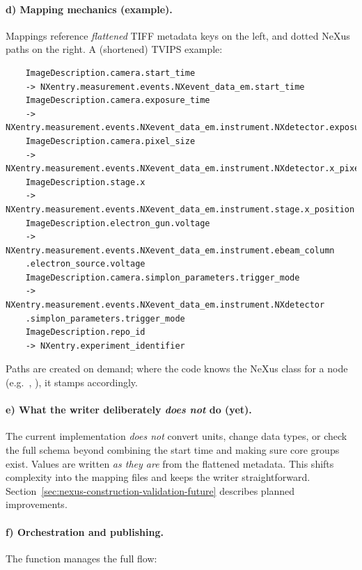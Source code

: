 \paragraph{d) Mapping mechanics (example).}
Mappings reference \emph{flattened} TIFF metadata keys on the left, and dotted NeXus paths on the right. A (shortened) TVIPS example:
\begin{verbatim}
	ImageDescription.camera.start_time
	-> NXentry.measurement.events.NXevent_data_em.start_time
	ImageDescription.camera.exposure_time
	-> NXentry.measurement.events.NXevent_data_em.instrument.NXdetector.exposure_time
	ImageDescription.camera.pixel_size
	-> NXentry.measurement.events.NXevent_data_em.instrument.NXdetector.x_pixel_size
	ImageDescription.stage.x
	-> NXentry.measurement.events.NXevent_data_em.instrument.stage.x_position
	ImageDescription.electron_gun.voltage
	-> NXentry.measurement.events.NXevent_data_em.instrument.ebeam_column
	.electron_source.voltage
	ImageDescription.camera.simplon_parameters.trigger_mode
	-> NXentry.measurement.events.NXevent_data_em.instrument.NXdetector
	.simplon_parameters.trigger_mode
	ImageDescription.repo_id
	-> NXentry.experiment_identifier
\end{verbatim}
\noindent Paths are created on demand; where the code knows the NeXus class for a node (e.g.\ , ), it stamps  accordingly.

\paragraph{e) What the writer deliberately \emph{does not} do (yet).}
The current implementation \emph{does not} convert units, change data types, or check the full schema beyond combining the start time and making sure core groups exist. Values are written \emph{as they are} from the flattened metadata. This shifts complexity into the mapping files and keeps the writer straightforward. Section~\ref{sec:nexus-construction-validation-future} describes planned improvements.

\paragraph{f) Orchestration and publishing.}
The function  manages the full flow:

